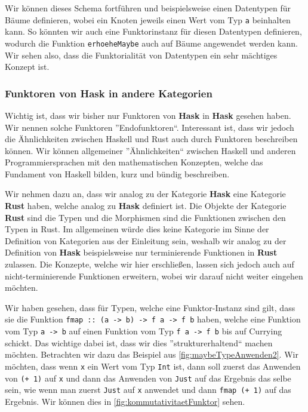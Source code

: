\documentclass{hhuarticle}
\theoremstyle{definition}
\theoremstyle{theorem}
\begin{document}
  Wir können dieses Schema fortführen und beispielsweise einen Datentypen
  für Bäume definieren, wobei ein Knoten jeweils einen Wert vom Typ \verb|a|
  beinhalten kann. So könnten wir auch eine Funktorinstanz für diesen
  Datentypen definieren, wodurch die Funktion \verb|erhoeheMaybe| auch auf
  Bäume angewendet werden kann. Wir sehen also, dass die Funktorialität
  von Datentypen ein sehr mächtiges Konzept ist.

  \subsubsection{Funktoren von \textbf{Hask} in andere Kategorien}

  Wichtig ist, dass wir bisher nur Funktoren von \textbf{Hask} in \textbf{Hask}
  gesehen haben. Wir nennen solche Funktoren ''Endofunktoren``.
  Interessant ist, dass wir jedoch die Ähnlichkeiten zwischen Haskell
  und Rust auch durch Funktoren beschreiben können. Wir können allgemeiner
  ''Ähnlichkeiten`` zwischen Haskell und anderen Programmiersprachen
  mit den mathematischen Konzepten, welche das Fundament von Haskell
  bilden, kurz und bündig beschreiben.

  Wir nehmen dazu an, dass wir analog zu der Kategorie \textbf{Hask}
  eine Kategorie \textbf{Rust} haben, welche analog zu \textbf{Hask}
  definiert ist. Die Objekte der Kategorie \textbf{Rust} sind die
  Typen und die Morphismen sind die Funktionen zwischen den Typen in
  Rust. Im allgemeinen würde dies keine Kategorie im Sinne der Definition
  von Kategorien aus der Einleitung sein, weshalb wir analog zu der
  Definition von \textbf{Hask} beispielsweise nur terminierende Funktionen
  in \textbf{Rust} zulassen. Die Konzepte, welche wir hier erschließen,
  lassen sich jedoch auch auf nicht-terminierende Funktionen erweitern,
  wobei wir darauf nicht weiter eingehen möchten.

  Wir haben gesehen, dass für Typen, welche eine Funktor-Instanz sind
  gilt, dass sie die Funktion \verb|fmap :: (a -> b) -> f a -> f b| haben,
  welche eine Funktion vom Typ \verb|a -> b| auf einen Funktion vom Typ
  \verb|f a -> f b| bis auf Currying schickt. Das wichtige dabei ist,
  dass wir dies ''strukturerhaltend`` machen möchten. Betrachten wir
  dazu das Beispiel aus \cref{fig:maybeTypeAnwenden2}. Wir möchten,
  dass wenn \verb|x| ein Wert vom Typ \verb|Int| ist, dann soll
  zuerst das Anwenden von \verb|(+ 1)| auf \verb|x| und dann das
  Anwenden von \verb|Just| auf das Ergebnis das selbe sein, wie wenn
  man zuerst \verb|Just| auf \verb|x| anwendet und dann \verb|fmap (+ 1)|
  auf das Ergebnis. Wir können dies in \cref{fig:kommutativitaetFunktor}
  sehen.
\end{document}
